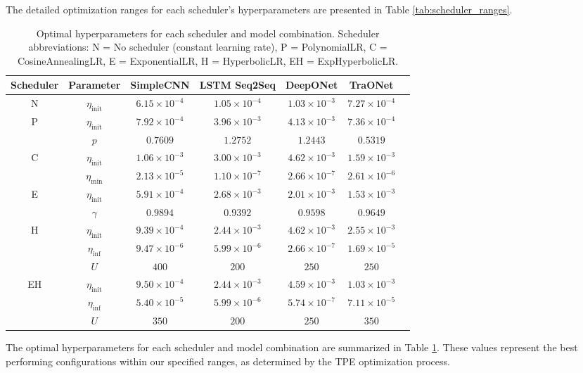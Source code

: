 \documentclass{article}
\theoremstyle{plain}
\theoremstyle{definition}
\theoremstyle{remark}
\begin{document}
The detailed optimization ranges for each scheduler's hyperparameters are presented in Table \ref{tab:scheduler_ranges}.
\begin{table}[h]
\caption{Optimal hyperparameters for each scheduler and model combination. Scheduler abbreviations: N = No scheduler (constant learning rate), P = PolynomialLR, C = CosineAnnealingLR, E = ExponentialLR, H = HyperbolicLR, EH = ExpHyperbolicLR.}
\label{tab:optimal_hyperparameters}
\begin{center}
\begin{small}
\begin{sc}
\begin{tabular}{ccccccc}
\toprule
\textbf{Scheduler} & \textbf{Parameter} & \textbf{SimpleCNN} & \textbf{LSTM Seq2Seq} & \textbf{DeepONet} & \textbf{TraONet} \\
\midrule
N & $\eta_\text{init}$ & $6.15 \times 10^{-4}$ & $1.05 \times 10^{-4}$ & $1.03 \times 10^{-3}$ & $7.27 \times 10^{-4}$ \\
\midrule
\multirow{2}{*}{P} & $\eta_\text{init}$ & $7.92 \times 10^{-4}$ & $3.96 \times 10^{-3}$ & $4.13 \times 10^{-3}$ & $7.36 \times 10^{-4}$ \\
& $p$ & $0.7609$ & $1.2752$ & $1.2443$ & $0.5319$ \\
\midrule
\multirow{2}{*}{C} & $\eta_\text{init}$ & $1.06 \times 10^{-3}$ & $3.00 \times 10^{-3}$ & $4.62 \times 10^{-3}$ & $1.59 \times 10^{-3}$ \\
& $\eta_\text{min}$ & $2.13 \times 10^{-5}$ & $1.10 \times 10^{-7}$ & $2.66 \times 10^{-7}$ & $2.61 \times 10^{-6}$ \\
\midrule
\multirow{2}{*}{E} & $\eta_\text{init}$ & $5.91 \times 10^{-4}$ & $2.68 \times 10^{-3}$ & $2.01 \times 10^{-3}$ & $1.53 \times 10^{-3}$ \\
& $\gamma$ & $0.9894$ & $0.9392$ & $0.9598$ & $0.9649$ \\
\midrule
\multirow{3}{*}{H} & $\eta_\text{init}$ & $9.39 \times 10^{-4}$ & $2.44 \times 10^{-3}$ & $4.62 \times 10^{-3}$ & $2.55 \times 10^{-3}$ \\
& $\eta_\text{inf}$ & $9.47 \times 10^{-6}$ & $5.99 \times 10^{-6}$ & $2.66 \times 10^{-7}$ & $1.69 \times 10^{-5}$ \\
& $U$ & $400$ & $200$ & $250$ & $250$ \\
\midrule
\multirow{3}{*}{EH} & $\eta_\text{init}$ & $9.50 \times 10^{-4}$ & $2.44 \times 10^{-3}$ & $4.59 \times 10^{-3}$ & $1.03 \times 10^{-3}$ \\
& $\eta_\text{inf}$ & $5.40 \times 10^{-5}$ & $5.99 \times 10^{-6}$ & $5.74 \times 10^{-7}$ & $7.11 \times 10^{-5}$ \\
& $U$ & $350$ & $200$ & $250$ & $350$ \\
\bottomrule
\end{tabular}
\end{sc}
\end{small}
\end{center}
\end{table}
The optimal hyperparameters for each scheduler and model combination are summarized in Table \ref{tab:optimal_hyperparameters}.
These values represent the best performing configurations within our specified ranges, as determined by the TPE optimization process.
\end{document}
